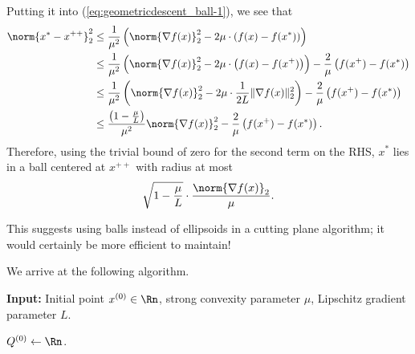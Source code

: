 Putting it into (\ref{eq:geometricdescent_ball-1}), we see that
\begin{align}
\norm{x^{*}-x^{++}}_{2}^{2} & \leq\frac{1}{\mu^{2}}\left(\norm{\nabla f(x)}_{2}^{2}-2\mu\cdot\left(f(x)-f(x^{*})\right)\right)\nonumber \\
 & \leq\frac{1}{\mu^{2}}\left(\norm{\nabla f(x)}_{2}^{2}-2\mu\cdot\left(f(x)-f(x^{+})\right)\right)-\frac{2}{\mu}\left(f(x^{+})-f(x^{*})\right)\nonumber \\
 & \leq\frac{1}{\mu^{2}}\left(\norm{\nabla f(x)}_{2}^{2}-2\mu\cdot\frac{1}{2L}\|\nabla f(x)\|_{2}^{2}\right)-\frac{2}{\mu}\left(f(x^{+})-f(x^{*})\right)\nonumber \\
 & \leq\frac{\left(1-\frac{\mu}{L}\right)}{\mu^{2}}\norm{\nabla f(x)}_{2}^{2}-\frac{2}{\mu}\left(f(x^{+})-f(x^{*})\right).\label{eq:radius-decrease}
\end{align}
Therefore, using the trivial bound of zero for the second term on
the RHS, $x^{*}$ lies in a ball centered at $x^{++}$ with radius
at most
\begin{equation}
\sqrt{1-\frac{\mu}{L}}\cdot\frac{\norm{\nabla f(x)}_{2}}{\mu}.\label{eq:geometr_descent_simple-1}
\end{equation}

This suggests using balls instead of ellipsoids in a cutting plane
algorithm; it would certainly be more efficient to maintain!

We arrive at the following algorithm.

\begin{algorithm2e}[H]

\caption{$\mathtt{SphereMethod}$}

\SetAlgoLined

\textbf{Input:} Initial point $x^{(0)}\in\Rn$, strong convexity parameter
$\mu$, Lipschitz gradient parameter $L$.

$Q^{(0)}\leftarrow\Rn$.


\end{algorithm2e}

